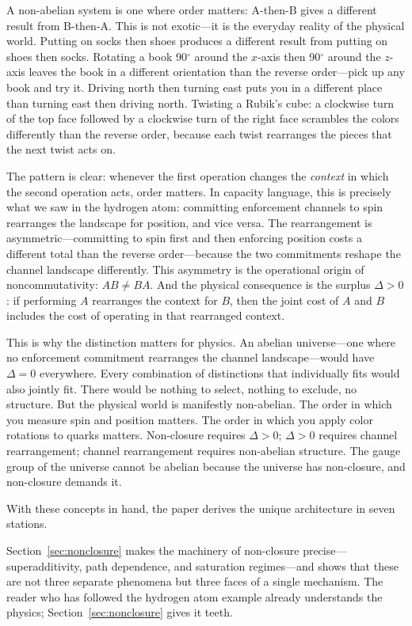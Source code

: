 \documentclass[11pt]{article}
\begin{document}
A non-abelian system is one where order matters: A-then-B gives a different result from B-then-A.  This is not exotic---it is the everyday reality of the physical world.  Putting on socks then shoes produces a different result from putting on shoes then socks.  Rotating a book 90$^\circ$ around the $x$-axis then 90$^\circ$ around the $z$-axis leaves the book in a different orientation than the reverse order---pick up any book and try it.  Driving north then turning east puts you in a different place than turning east then driving north.  Twisting a Rubik's cube: a clockwise turn of the top face followed by a clockwise turn of the right face scrambles the colors differently than the reverse order, because each twist rearranges the pieces that the next twist acts on.

The pattern is clear: whenever the first operation changes the \emph{context} in which the second operation acts, order matters.  In capacity language, this is precisely what we saw in the hydrogen atom: committing enforcement channels to spin rearranges the landscape for position, and vice versa.  The rearrangement is asymmetric---committing to spin first and then enforcing position costs a different total than the reverse order---because the two commitments reshape the channel landscape differently.  This asymmetry is the operational origin of noncommutativity: $AB \ne BA$.  And the physical consequence is the surplus $\Delta > 0$: if performing $A$ rearranges the context for $B$, then the joint cost of $A$ and $B$ includes the cost of operating in that rearranged context.

This is why the distinction matters for physics.  An abelian universe---one where no enforcement commitment rearranges the channel landscape---would have $\Delta = 0$ everywhere.  Every combination of distinctions that individually fits would also jointly fit.  There would be nothing to select, nothing to exclude, no structure.  But the physical world is manifestly non-abelian.  The order in which you measure spin and position matters.  The order in which you apply color rotations to quarks matters.  Non-closure requires $\Delta > 0$; $\Delta > 0$ requires channel rearrangement; channel rearrangement requires non-abelian structure.  The gauge group of the universe cannot be abelian because the universe has non-closure, and non-closure demands it.

With these concepts in hand, the paper derives the unique architecture in seven stations.

Section~\ref{sec:nonclosure} makes the machinery of non-closure precise---superadditivity, path dependence, and saturation regimes---and shows that these are not three separate phenomena but three faces of a single mechanism.  The reader who has followed the hydrogen atom example already understands the physics; Section~\ref{sec:nonclosure} gives it teeth.
\end{document}
